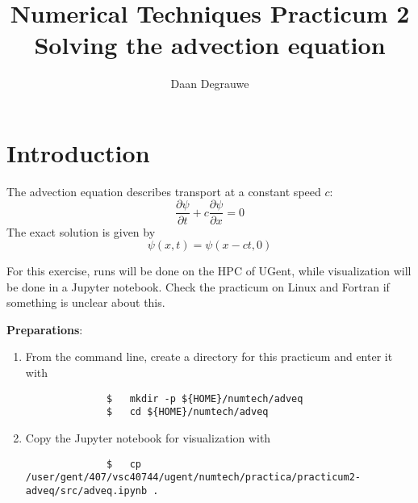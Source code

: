 \documentclass[a4paper]{article}
\title{%
	\bfseries%
	{\large Numerical Techniques Practicum 2}\\[3ex]
	{\Large Solving the advection equation}
}
\author{Daan Degrauwe}
\begin{document}
%
\maketitle
%
\section{Introduction}
%
\par
The advection equation describes transport at a constant speed $c$:
%
\begin{equation}
	\frac{\partial \psi}{\partial t}+c\frac{\partial \psi}{\partial x}=0
\end{equation}
%
The exact solution is given by
%
\begin{equation}
	\psi(x,t)=\psi(x-ct,0)
\end{equation}
%
\par
For this exercise, runs will be done on the HPC of UGent, while visualization will be done in a Jupyter notebook. Check the practicum on Linux and Fortran if something is unclear about this.
%
\par\vspace*{3ex}
\textbf{Preparations}:
%
\begin{enumerate}
	\item From the command line, create a directory for this practicum and enter it with
		\begin{verbatim}
			  $   mkdir -p ${HOME}/numtech/adveq
			  $   cd ${HOME}/numtech/adveq
		\end{verbatim}
	\item Copy the Jupyter notebook for visualization with
		\begin{verbatim}
			  $   cp /user/gent/407/vsc40744/ugent/numtech/practica/practicum2-adveq/src/adveq.ipynb .
		\end{verbatim}
\end{enumerate}
%
\end{document}
